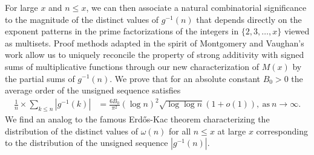 \documentclass[10pt,reqno,letterpaper]{article}
\theoremstyle{plain}
\numberwithin{theorem}{section}
\theoremstyle{definition}
\begin{document}
For large $x$ and $n \leq x$, we can then associate a natural combinatorial 
significance to the magnitude of the distinct values of 
$g^{-1}(n)$ that depends directly on the exponent patterns in the 
prime factorizations of the integers in $\{2,3,\ldots,x\}$ viewed as multisets.
Proof methods adapted in the spirit of Montgomery and Vaughan's work \cite{MV} 
allow us to uniquely reconcile the property of strong additivity with signed sums of 
multiplicative functions through our new characterization of 
$M(x)$ by the partial sums of $g^{-1}(n)$. 
We prove 
that for an absolute constant $B_0 > 0$ the average order 
of the unsigned sequence satisfies 
\begin{align*}
\frac{1}{n} \times \sum_{k \leq n} |g^{-1}(k)| & = 
     \frac{6B_0 }{\pi^2} (\log n)^2\sqrt{\log\log n} (1+o(1)), 
     \mathrm{\ as\ } n \rightarrow \infty. 
\end{align*}
We find an analog to the famous Erd\H{o}s-Kac theorem 
\cite{BILLINGSLY-CLT-PRIMEDIVFUNC,ERDOS-KAC-REF} 
characterizing the 
distribution of the distinct values of $\omega(n)$ for all $n \leq x$ at large $x$ 
corresponding to the distribution of the unsigned sequence $|g^{-1}(n)|$. 
\end{document}
